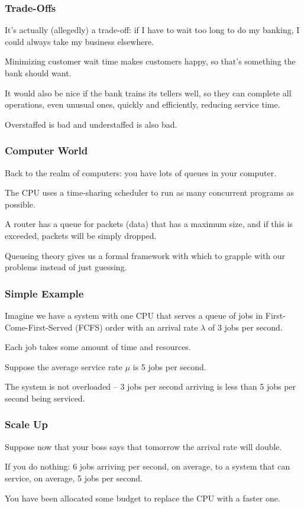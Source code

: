 \begin{frame}
\frametitle{Trade-Offs}

It's actually (allegedly) a trade-off: if I have to wait too long to do my banking, I could always take my business elsewhere. 

Minimizing customer wait time makes customers happy, so that's something the bank should want. 

It would also be nice if the bank trains its tellers well, so they can complete all operations, even unusual ones, quickly and efficiently, reducing service time.

Overstaffed is bad and understaffed is also bad. 

\end{frame}



\begin{frame}
\frametitle{Computer World}

Back to the realm of computers: you have lots of queues in your computer. 

The CPU uses a time-sharing scheduler to run as many concurrent programs as possible. 

A router has a queue for packets (data) that has a maximum size, and if this is exceeded, packets will be simply dropped. 

Queueing theory gives us a formal framework with which to grapple with our problems instead of just guessing.


\end{frame}



\begin{frame}
\frametitle{Simple Example}

Imagine we have a system with one CPU that serves a queue of jobs in First-Come-First-Served (FCFS) order with an arrival rate $\lambda$ of 3 jobs per second. 

Each job takes some amount of time and resources. 

Suppose the average service rate $\mu$ is 5 jobs per second. 

The system is not overloaded -- 3 jobs per second arriving is less than 5 jobs per second being serviced. 

\end{frame}



\begin{frame}
\frametitle{Scale Up}

Suppose now that your boss says that tomorrow the arrival rate will double.

If you do nothing: 6 jobs arriving per second, on average, to a system that can service, on average, 5 jobs per second. 

You have been allocated some budget to replace the CPU with a faster one.

\end{frame}



